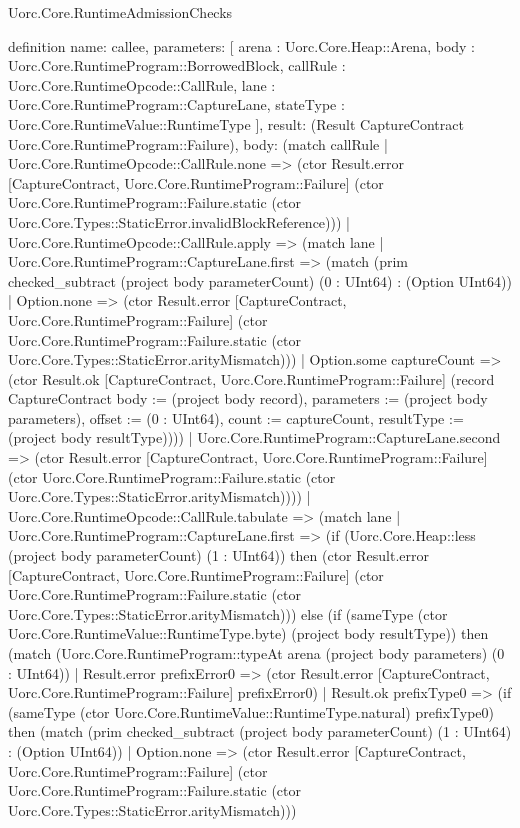 \begin{lexlean}{Uorc.Core.RuntimeAdmissionChecks}
\begin{semanticmodule}
definition{
  name: callee,
  parameters: [
    arena : Uorc.Core.Heap::Arena,
    body : Uorc.Core.RuntimeProgram::BorrowedBlock,
    callRule : Uorc.Core.RuntimeOpcode::CallRule,
    lane : Uorc.Core.RuntimeProgram::CaptureLane,
    stateType : Uorc.Core.RuntimeValue::RuntimeType
  ],
  result: (Result CaptureContract Uorc.Core.RuntimeProgram::Failure),
  body: (match callRule
    | Uorc.Core.RuntimeOpcode::CallRule.none => (ctor Result.error [CaptureContract, Uorc.Core.RuntimeProgram::Failure] (ctor Uorc.Core.RuntimeProgram::Failure.static (ctor Uorc.Core.Types::StaticError.invalidBlockReference)))
    | Uorc.Core.RuntimeOpcode::CallRule.apply => (match lane
      | Uorc.Core.RuntimeProgram::CaptureLane.first => (match (prim checked_subtract (project body parameterCount) (0 : UInt64) : (Option UInt64))
        | Option.none => (ctor Result.error [CaptureContract, Uorc.Core.RuntimeProgram::Failure] (ctor Uorc.Core.RuntimeProgram::Failure.static (ctor Uorc.Core.Types::StaticError.arityMismatch)))
        | Option.some captureCount => (ctor Result.ok [CaptureContract, Uorc.Core.RuntimeProgram::Failure] (record CaptureContract {body := (project body record), parameters := (project body parameters), offset := (0 : UInt64), count := captureCount, resultType := (project body resultType)})))
      | Uorc.Core.RuntimeProgram::CaptureLane.second => (ctor Result.error [CaptureContract, Uorc.Core.RuntimeProgram::Failure] (ctor Uorc.Core.RuntimeProgram::Failure.static (ctor Uorc.Core.Types::StaticError.arityMismatch))))
    | Uorc.Core.RuntimeOpcode::CallRule.tabulate => (match lane
      | Uorc.Core.RuntimeProgram::CaptureLane.first => (if (Uorc.Core.Heap::less (project body parameterCount) (1 : UInt64)) then (ctor Result.error [CaptureContract, Uorc.Core.RuntimeProgram::Failure] (ctor Uorc.Core.RuntimeProgram::Failure.static (ctor Uorc.Core.Types::StaticError.arityMismatch))) else (if (sameType (ctor Uorc.Core.RuntimeValue::RuntimeType.byte) (project body resultType)) then (match (Uorc.Core.RuntimeProgram::typeAt arena (project body parameters) (0 : UInt64))
        | Result.error prefixError0 => (ctor Result.error [CaptureContract, Uorc.Core.RuntimeProgram::Failure] prefixError0)
        | Result.ok prefixType0 => (if (sameType (ctor Uorc.Core.RuntimeValue::RuntimeType.natural) prefixType0) then (match (prim checked_subtract (project body parameterCount) (1 : UInt64) : (Option UInt64))
          | Option.none => (ctor Result.error [CaptureContract, Uorc.Core.RuntimeProgram::Failure] (ctor Uorc.Core.RuntimeProgram::Failure.static (ctor Uorc.Core.Types::StaticError.arityMismatch)))
}
\end{semanticmodule}
\end{lexlean}

